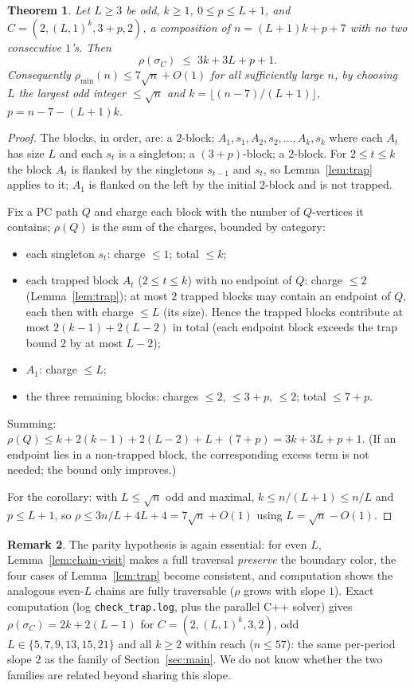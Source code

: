 \documentclass[11pt]{article}
\newtheorem{theorem}{Theorem}[section]
\theoremstyle{definition}
\newtheorem{remark}[theorem]{Remark}
\newcommand{\pmin}{\rho_{\min}}
\begin{document}
\begin{theorem}\label{thm:trap-main}
Let $L \ge 3$ be odd, $k \ge 1$, $0 \le p \le L+1$, and $C = (2, (L, 1)^k, 3+p, 2)$, a
composition of $n = (L+1)k + p + 7$ with no two consecutive $1$'s. Then
\[
\rho(\sigma_C) \;\le\; 3k + 3L + p + 1 .
\]
Consequently $\pmin(n) \le 7\sqrt n + O(1)$ for all sufficiently large $n$, by choosing
$L$ the largest odd integer $\le \sqrt n$ and $k = \lfloor (n-7)/(L+1) \rfloor$,
$p = n - 7 - (L+1)k$.
\end{theorem}

\begin{proof}
The blocks, in order, are: a $2$-block; $A_1, s_1, A_2, s_2, \dots, A_k, s_k$ where each
$A_t$ has size $L$ and each $s_t$ is a singleton; a $(3+p)$-block; a $2$-block. For
$2 \le t \le k$ the block $A_t$ is flanked by the singletons $s_{t-1}$ and $s_t$, so
Lemma~\ref{lem:trap} applies to it; $A_1$ is flanked on the left by the initial
$2$-block and is not trapped.

Fix a PC path $Q$ and charge each block with the number of $Q$-vertices it contains;
$\rho(Q)$ is the sum of the charges, bounded by category:
\begin{itemize}
\item each singleton $s_t$: charge $\le 1$; total $\le k$;
\item each trapped block $A_t$ ($2 \le t \le k$) with no endpoint of $Q$: charge $\le
2$ (Lemma~\ref{lem:trap}); at most $2$ trapped blocks may contain an endpoint of $Q$,
each then with charge $\le L$ (its size). Hence the trapped blocks contribute at most
$2(k-1) + 2(L - 2)$ in total (each endpoint block exceeds the trap bound $2$ by at most
$L - 2$);
\item $A_1$: charge $\le L$;
\item the three remaining blocks: charges $\le 2$, $\le 3+p$, $\le 2$; total $\le 7+p$.
\end{itemize}
Summing: $\rho(Q) \le k + 2(k-1) + 2(L-2) + L + (7+p) = 3k + 3L + p + 1$. (If an
endpoint lies in a non-trapped block, the corresponding excess term is not needed; the
bound only improves.)

For the corollary: with $L \le \sqrt n$ odd and maximal, $k \le n/(L+1) \le n/L$ and
$p \le L + 1$, so $\rho \le 3n/L + 4L + 4 = 7\sqrt n + O(1)$ using $L = \sqrt n -
O(1)$.
\end{proof}

\begin{remark}\label{rem:trap-data}
The parity hypothesis is again essential: for even $L$, Lemma~\ref{lem:chain-visit}
makes a full traversal \emph{preserve} the boundary color, the four cases of
Lemma~\ref{lem:trap} become consistent, and computation shows the analogous even-$L$
chains are fully traversable ($\rho$ grows with slope $1$). Exact computation (log
\texttt{check\_trap.log}, plus the parallel C++ solver) gives
$\rho(\sigma_C) = 2k + 2(L-1)$ for $C = (2,(L,1)^k,3,2)$, odd $L \in \{5,7,9,13,15,21\}$
and all $k \ge 2$ within reach ($n \le 57$): the same per-period slope $2$ as the family
of Section~\ref{sec:main}. We do not know whether the two families are related beyond
sharing this slope.
\end{remark}
\end{document}
